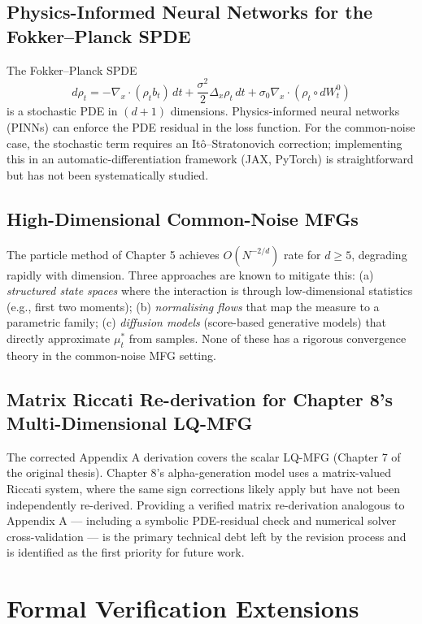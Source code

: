 \subsection{Physics-Informed Neural Networks for the Fokker--Planck SPDE}

The Fokker--Planck SPDE
\[
    d\rho_t = -\nabla_x \cdot (\rho_t b_t)\, dt + \frac{\sigma^2}{2}\Delta_x \rho_t\, dt
    + \sigma_0 \nabla_x \cdot (\rho_t \circ dW_t^0)
\]
is a stochastic PDE in $(d+1)$ dimensions. Physics-informed neural networks
(PINNs) can enforce the PDE residual in the loss function. For the common-noise
case, the stochastic term requires an It\^{o}--Stratonovich correction; implementing
this in an automatic-differentiation framework (JAX, PyTorch) is straightforward
but has not been systematically studied.

\subsection{High-Dimensional Common-Noise MFGs}

The particle method of Chapter 5 achieves $O(N^{-2/d})$ rate for $d \ge 5$,
degrading rapidly with dimension. Three approaches are known to mitigate this:
(a) \emph{structured state spaces} where the interaction is through low-dimensional
statistics (e.g., first two moments); (b) \emph{normalising flows} that map the
measure to a parametric family; (c) \emph{diffusion models} (score-based
generative models) that directly approximate $\mu_t^*$ from samples. None of these
has a rigorous convergence theory in the common-noise MFG setting.

\subsection{Matrix Riccati Re-derivation for Chapter 8's Multi-Dimensional LQ-MFG}

The corrected Appendix A derivation covers the scalar LQ-MFG (Chapter 7 of the
original thesis). Chapter 8's alpha-generation model uses a matrix-valued Riccati
system, where the same sign corrections likely apply but have not been independently
re-derived. Providing a verified matrix re-derivation analogous to Appendix A ---
including a symbolic PDE-residual check and numerical solver cross-validation ---
is the primary technical debt left by the revision process and is identified as the
first priority for future work.

\section{Formal Verification Extensions}
\label{sec:fut-lean}

